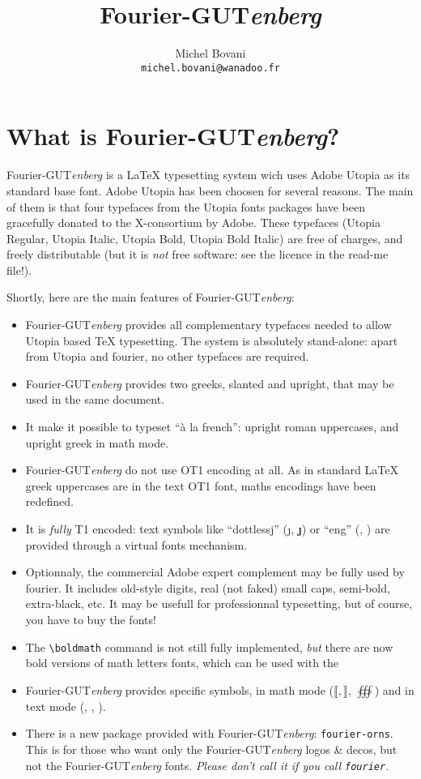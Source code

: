 \documentclass[a4paper,11pt]{article}
\title{\decofourleft{}\,Fourier-GUT{\itshape enberg}\,\decofourright}
\author{Michel Bovani\\\texttt{michel.bovani@wanadoo.fr}}
\newcommand{\fourier}{Fourier-GUT\textit{enberg}}
\begin{document}
\maketitle

\section{What is \fourier{}?}
\fourier{} is a \LaTeX{} typesetting system wich uses Adobe Utopia as its standard base font. 
Adobe Utopia has been choosen for several reasons. The main of them is that
four typefaces from the Utopia fonts packages have been gracefully donated to the X-consortium by 
Adobe. These typefaces (Utopia Regular, Utopia Italic, Utopia Bold, Utopia Bold Italic)
 are free of charges, and freely distributable (but it is \emph{not} free software: 
 see the licence in the read-me file!).
\par
Shortly, here are the main features of \fourier:
\begin{itemize}
\item \fourier{} provides all complementary typefaces needed to allow Utopia based \TeX{} typesetting. 
The system is absolutely stand-alone: apart from Utopia and fourier, no other typefaces are required.
\item \fourier{} provides two greeks, slanted and upright, that may be used in the same document.
\item It make it possible to typeset ``à la french'': upright roman uppercases, 
and upright greek in math mode.
\item \fourier{} do not use OT1 encoding at all. As in standard \LaTeX{} greek uppercases 
are in the text OT1 font, maths encodings have been redefined.
\item It is \emph{fully} T1 encoded: text symbols like ``dottlessj'' (\j, \textbf{\j}) or ``eng'' (\ng, \NG) are provided 
through a virtual fonts mechanism.
\item Optionnaly, the commercial Adobe expert complement may be fully used by fourier. 
It includes old-style digits, real (not faked) small caps, semi-bold, extra-black, etc.
 It may be usefull for professionnal typesetting, but of course, you have to buy the fonts!
\item The \verb=\boldmath= command is not still fully implemented, \emph{but} there are
 now bold versions of math letters fonts, which can be used with the 
 \item \fourier{} provides specific symbols, in math mode ($\llbracket, 
\rrbracket$, $\oiiint$) and in text mode (\texteuro, \eurologo, \aldineright).
\item There is a new package provided with \fourier{}: \texttt{fourier-orns}. 
This is for those who want only the \fourier{} logos \& decos, but not the \fourier{} fonts.
\textit{Please don't call it if you call \texttt{fourier}}.
\end{itemize}
\end{document}
